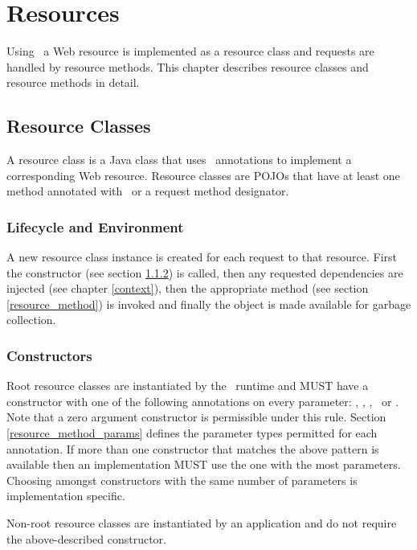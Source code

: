 \chapter{Resources}
\label{resources}

Using \jaxrs\, a Web resource is implemented as a resource class and requests are handled by resource methods. This chapter describes resource classes and resource methods in detail.

\section{Resource Classes}

A resource class is a Java class that uses \jaxrs\ annotations to implement a corresponding Web resource. Resource classes are POJOs that have at least one method annotated with \Path\ or a request method designator.

\subsection{Lifecycle and Environment}

A new resource class instance is created for each request to that resource. First the constructor (see section \ref{resource_class_constructor}) is called, then any requested dependencies are injected (see chapter \ref{context}), then the appropriate method (see section \ref{resource_method}) is invoked and finally the object is made available for garbage collection.

\subsection{Constructors}
\label{resource_class_constructor}

Root resource classes are instantiated by the \jaxrs\ runtime and MUST have a constructor with one of the following annotations on every parameter: \Context, \HeaderParam, \MatrixParam, \QueryParam\ or \PathParam. Note that a zero argument constructor is permissible under this rule. Section \ref{resource_method_params} defines the parameter types permitted for each annotation. If more than one constructor that matches the above pattern is available then an implementation MUST use the one with the most parameters. Choosing amongst constructors with the same number of parameters is implementation specific.

Non-root resource classes are instantiated by an application and do not require the above-described constructor.

